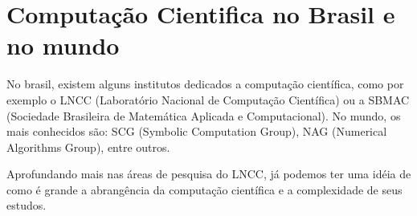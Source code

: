 \section{Computação Cientifica no Brasil e no mundo}
\label{sec:computacao-cientifica}

	No brasil, existem alguns institutos dedicados a computação científica, como
	por exemplo o LNCC (Laboratório Nacional de Computação Científica) ou a
	SBMAC (Sociedade Brasileira de Matemática Aplicada e Computacional). No
	mundo, os mais conhecidos são: SCG (Symbolic Computation Group), NAG
	(Numerical Algorithms Group), entre outros.

	Aprofundando mais nas áreas de pesquisa do LNCC, já podemos ter uma idéia de
	como é grande a abrangência da computação científica e a complexidade de
	seus estudos.

